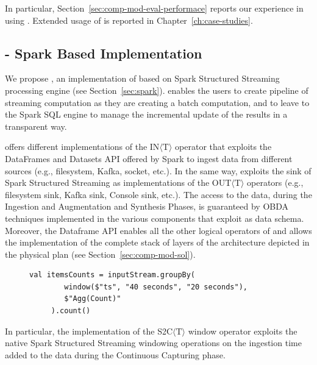 In particular, Section~\ref{sec:comp-mod-eval-performace} reports our experience in using \sparkdi{}. Extended usage of \hivedi{} is reported in Chapter~\ref{ch:case-studies}.


\subsection{\protect\sparkdi{} - Spark Based Implementation} \label{sec:comp-mod-impl-h-spark}
We propose \sparkdi{}, an implementation of \river{} based on Spark Structured Streaming processing engine (see Section~\ref{sec:spark}). 
\sparkdi{} enables the users to create pipeline of streaming computation as they are creating a batch computation, and to leave to the Spark SQL engine to manage the incremental update of the results in a transparent way.

\sparkdi{} offers different implementations of the IN$\langle\mathrm{T}\rangle$ operator that exploits the DataFrames and Datasets API offered by Spark to ingest data from different sources (e.g., filesystem, Kafka, socket, etc.).
In the same way, \sparkdi{} exploits the sink of Spark Structured Streaming as implementations of the OUT$\langle\mathrm{T}\rangle$ operators (e.g., filesystem sink, Kafka sink, Console sink, etc.).
The access to the data, during the Ingestion and Augmentation and Synthesis Phases,  is guaranteed by OBDA techniques implemented in the various components that exploit \frappe{} as data schema.
Moreover, the Dataframe API enables all the other logical operators of \river{} and allows the implementation of the complete stack of layers of the architecture depicted in the \river{} physical plan (see Section~\ref{sec:comp-mod-sol}).

\begin{figure}[ht]
\begin{minipage}{0.95\linewidth}
\begin{lstlisting}[caption={Example of Window operator in Spark},label=lst:spark-ex,style=SPARKCODE]
   val itemsCounts = inputStream.groupBy(
        window($"ts", "40 seconds", "20 seconds"),
        $"Agg(Count)"
     ).count()
\end{lstlisting}
\end{minipage}
\end{figure}

In particular, the \sparkdi{} implementation of the S2C$\langle\mathrm{T}\rangle$ window operator exploits the native Spark Structured Streaming windowing operations on the ingestion time added to the data during the Continuous Capturing phase.

